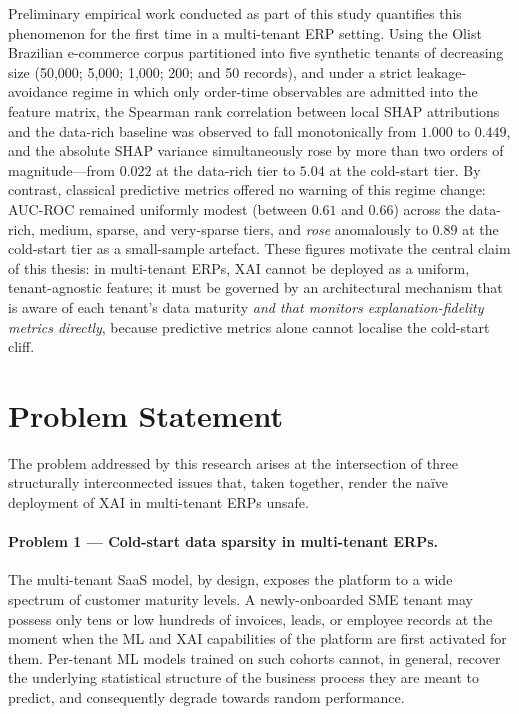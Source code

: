 Preliminary empirical work conducted as part of this study quantifies this phenomenon for the first time in a multi-tenant ERP setting. Using the Olist Brazilian e-commerce corpus partitioned into five synthetic tenants of decreasing size (50{,}000; 5{,}000; 1{,}000; 200; and 50 records), and under a strict leakage-avoidance regime in which only order-time observables are admitted into the feature matrix, the Spearman rank correlation between local SHAP attributions and the data-rich baseline was observed to fall monotonically from $1.000$ to $0.449$, and the absolute SHAP variance simultaneously rose by more than two orders of magnitude---from $0.022$ at the data-rich tier to $5.04$ at the cold-start tier. By contrast, classical predictive metrics offered no warning of this regime change: AUC-ROC remained uniformly modest (between $0.61$ and $0.66$) across the data-rich, medium, sparse, and very-sparse tiers, and \emph{rose} anomalously to $0.89$ at the cold-start tier as a small-sample artefact. These figures motivate the central claim of this thesis: in multi-tenant ERPs, XAI cannot be deployed as a uniform, tenant-agnostic feature; it must be governed by an architectural mechanism that is aware of each tenant's data maturity \emph{and that monitors explanation-fidelity metrics directly}, because predictive metrics alone cannot localise the cold-start cliff.

\section{Problem Statement}
\label{sec:problem-statement}

The problem addressed by this research arises at the intersection of three structurally interconnected issues that, taken together, render the na\"ive deployment of XAI in multi-tenant ERPs unsafe.

\paragraph{Problem 1 --- Cold-start data sparsity in multi-tenant ERPs.}
The multi-tenant SaaS model, by design, exposes the platform to a wide spectrum of customer maturity levels. A newly-onboarded SME tenant may possess only tens or low hundreds of invoices, leads, or employee records at the moment when the ML and XAI capabilities of the platform are first activated for them. Per-tenant ML models trained on such cohorts cannot, in general, recover the underlying statistical structure of the business process they are meant to predict, and consequently degrade towards random performance.

